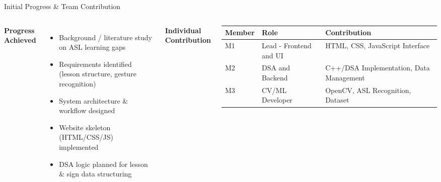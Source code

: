 \documentclass[aspectratio=169,10pt]{beamer}
\begin{document}
\begin{frame}{Initial Progress \& Team Contribution}
\begin{columns}[T,totalwidth=\textwidth]
\textbf{\color{GEUBlue}Progress Achieved}
\begin{itemize}\itemsep1pt
\item Background / literature study on ASL learning gaps
\item Requirements identified (lesson structure, gesture recognition)
\item System architecture \& workflow designed
\item Website skeleton (HTML/CSS/JS) implemented
\item DSA logic planned for lesson \& sign data structuring
\end{itemize}
\textbf{\color{GEUBlue}Individual Contribution}
\vspace{1mm}
\scriptsize
\begin{tabularx}{\textwidth}{@{}p{1.8cm}p{2.0cm}X@{}}
\toprule
Member & Role & Contribution\\
\midrule
M1 & Lead - Frontend and UI & HTML, CSS, JavaScript Interface\\
M2 & DSA and Backend & C++/DSA Implementation, Data Management\\
M3 & CV/ML Developer & OpenCV, ASL Recognition, Dataset\\

\bottomrule
\end{tabularx}
\end{columns}
\end{frame}
\end{document}
